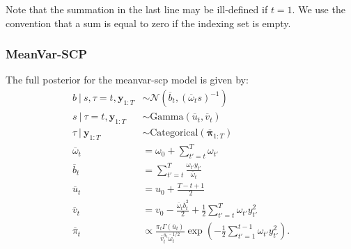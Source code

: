 Note that the summation in the last line may be ill-defined if $t = 1$. We use the convention that a sum is equal to zero if the indexing set is empty.

\subsubsection{MeanVar-SCP}

The full posterior for the meanvar-scp model is given by:
\begin{align}
    b \:|\: s, \tau = t, \mathbf{y}_{1:T} &\sim \mathcal{N}(\overline{b}_t, (\overline{\omega}_t s)^{-1}) \\
    s \:|\: \tau = t, \mathbf{y}_{1:T} &\sim \text{Gamma}(\overline{u}_t, \overline{v}_t) \\
    \tau \:|\: \mathbf{y}_{1:T} &\sim \text{Categorical}(\overline{\boldsymbol{\pi}}_{1:T}) \\
    \overline{\omega}_t &= \omega_0 + \sum_{t' = t}^{T} \omega_{t'} \label{eq:meanvar-scp-post-omega} \\
    \overline{b}_t &=  \sum_{t'=t}^{T} \frac{\omega_{t'} y_{t'}}{\overline{\omega}_t} \\
    \overline{u}_t &= u_0 + \frac{T  - t + 1}{2} \label{eq:meanvar-scp-post-b}\\
    \overline{v}_t &= v_0 - \frac{\overline{\omega}_t\overline{b}^2_t}{2} + \frac{1}{2} \sum_{t'=t}^{T} \omega_{t'}y_{t'}^2 \label{eq:meanvar-scp-post-v} \\
    \overline{\pi}_t &\propto \frac{\pi_t\Gamma(\overline{u}_t)}{\overline{v}_t^{\overline{u}_t}\overline{\omega}_t^{1/2} } \exp\left(-\frac{1}{2}\sum_{t'=1}^{t-1} \omega_{t'}y^2_{t'}\right). \label{eq:meanvar-scp-post-pi}
\end{align}

